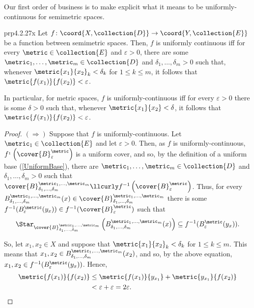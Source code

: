 Our first order of business is to make explicit what it means to be uniformly-continuous for semimetric spaces.
\begin{prp}{}{prp4.2.27x}
Let $f\colon \coord{X,\collection{D}}\rightarrow \coord{Y,\collection{E}}$ be a function between semimetric spaces.  Then, $f$ is uniformly continuous iff for every $\metric \in \collection{E}$ and $\varepsilon >0$, there are some $\metric _1,\ldots ,\metric _m\in \collection{D}$ and $\delta _1,\ldots ,\delta _m>0$ such that, whenever $\metric{x_1}{x_2}_k<\delta _k$ for $1\leq k\leq m$, it follows that $\metric{f(x_1)}{f(x_2)}<\varepsilon$.
\begin{rmk}
In particular, for metric spaces, $f$ is uniformly-continuous iff for every $\varepsilon >0$ there is some $\delta >0$ such that, whenever $\metric{x_1}{x_2}<\delta$, it follows that $\metric{f(x_1)}{f(x_2)}<\varepsilon$.
\end{rmk}
\begin{proof}
$(\Rightarrow )$ Suppose that $f$ is uniformly-continuous.  Let $\metric _1\in \collection{E}$ and let $\varepsilon >0$.  Then, as $f$ is uniformly-continuous, $f^{_1}\left( \cover{B}_{\varepsilon}^{\metric}\right)$ is a uniform cover, and so, by the definition of a uniform base (\cref{UniformBase}), there are $\metric _1,\ldots ,\metric _m\in \collection{D}$ and $\delta _1,\ldots ,\delta _m>0$ such that $\cover{B}_{\delta _1,\ldots ,\delta _m}^{\metric _1,\ldots ,\metric _m}\llcurly f^{-1}\left( \cover{B}_{\varepsilon}^{\metric}\right)$.  Thus, for every $B_{\delta _1,\ldots ,\delta _m}^{\metric _1,\ldots ,\metric _m}(x)\in \cover{B}_{\delta _1,\ldots ,\delta _m}^{\metric _1,\ldots ,\metric _m}$ there is some $f^{-1}(B_{\varepsilon}^{\metric}(y_x))\in f^{-1}(\cover{B}_{\varepsilon}^{\metric})$ such that
\begin{equation*}
\Star _{\cover{B}_{\delta _1,\ldots ,\delta _m}^{\metric _1,\ldots ,\metric _m}}\left( B_{\delta _1,\ldots ,\delta _m}^{\metric _1,\ldots ,\metric _m}(x)\right) \subseteq f^{-1}(B_{\varepsilon}^{\metric}(y_x)).
\end{equation*}

So, let $x_1,x_2\in X$ and suppose that $\metric{x_1}{x_2}_k<\delta _k$ for $1\leq k\leq m$.  This means that $x_1,x_2\in B_{\delta _1,\ldots ,\delta _m}^{\metric _1,\ldots ,\metric _m}(x_2)$, and so, by the above equation, $x_1,x_2\in f^{-1}(B_{\varepsilon}^{\metric}(y_x))$.  Hence,
\begin{equation}
\begin{split}
\metric{f(x_1)}{f(x_2)} & \leq \metric{f(x_1)}{y_{x_1}}+\metric{y_{x_1}}{f(x_2)} \\
& <\varepsilon +\varepsilon =2\varepsilon .
\end{split}
\end{equation}


\end{proof}
\end{prp}
